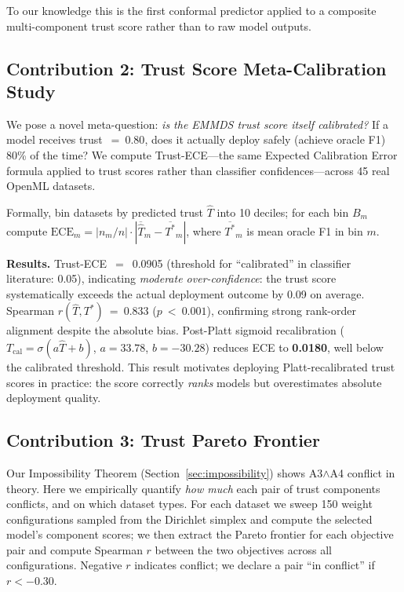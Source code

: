 \documentclass[10pt]{article}
\begin{document}
To our knowledge this is the first conformal predictor applied to a composite multi-component trust score rather than to raw model outputs.

\subsection{Contribution 2: Trust Score Meta-Calibration Study}
\label{sec:metacal}

We pose a novel meta-question: \emph{is the EMMDS trust score itself calibrated?} If a model receives trust~$=~0.80$, does it actually deploy safely (achieve oracle F1) 80\% of the time? We compute Trust-ECE—the same Expected Calibration Error formula applied to trust scores rather than classifier confidences—across 45 real OpenML datasets.

Formally, bin datasets by predicted trust $\hat{T}$ into 10 deciles; for each bin $B_m$ compute $\text{ECE}_m = |n_m/n| \cdot |\overline{\hat{T}}_m - \overline{T^*}_m|$, where $\overline{T^*}_m$ is mean oracle F1 in bin $m$.

\textbf{Results.} Trust-ECE~$=$~0.0905 (threshold for ``calibrated'' in classifier literature: 0.05), indicating \emph{moderate over-confidence}: the trust score systematically exceeds the actual deployment outcome by 0.09 on average. Spearman $r(\hat{T}, T^*)~=~0.833$ ($p~<~0.001$), confirming strong rank-order alignment despite the absolute bias. Post-Platt sigmoid recalibration ($T_\text{cal} = \sigma(a\hat{T}+b)$, $a{=}33.78$, $b{=}{-}30.28$) reduces ECE to \textbf{0.0180}, well below the calibrated threshold. This result motivates deploying Platt-recalibrated trust scores in practice: the score correctly \emph{ranks} models but overestimates absolute deployment quality.

\subsection{Contribution 3: Trust Pareto Frontier}
\label{sec:pareto}

Our Impossibility Theorem (Section~\ref{sec:impossibility}) shows A3$\wedge$A4 conflict in theory. Here we empirically quantify \emph{how much} each pair of trust components conflicts, and on which dataset types. For each dataset we sweep 150 weight configurations sampled from the Dirichlet simplex and compute the selected model's component scores; we then extract the Pareto frontier for each objective pair and compute Spearman $r$ between the two objectives across all configurations. Negative $r$ indicates conflict; we declare a pair ``in conflict'' if $r < -0.30$.
\end{document}
